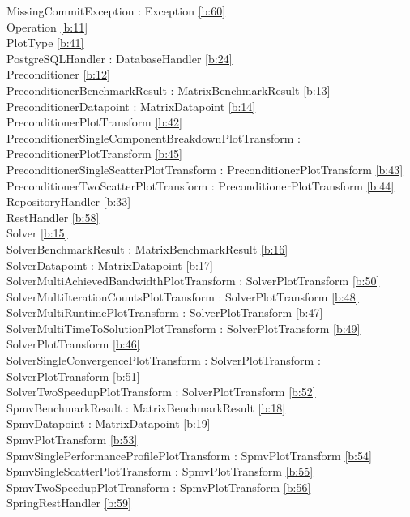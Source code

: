 MissingCommitException : Exception  \ref{b:60}\\
Operation  \ref{b:11}\\
PlotType  \ref{b:41}\\
PostgreSQLHandler : DatabaseHandler  \ref{b:24}\\
Preconditioner  \ref{b:12}\\
PreconditionerBenchmarkResult : MatrixBenchmarkResult  \ref{b:13}\\
PreconditionerDatapoint : MatrixDatapoint  \ref{b:14}\\
PreconditionerPlotTransform  \ref{b:42}\\
PreconditionerSingleComponentBreakdownPlotTransform : PreconditionerPlotTransform  \ref{b:45}\\
PreconditionerSingleScatterPlotTransform : PreconditionerPlotTransform  \ref{b:43}\\
PreconditionerTwoScatterPlotTransform : PreconditionerPlotTransform  \ref{b:44}\\
RepositoryHandler  \ref{b:33}\\
RestHandler  \ref{b:58}\\
Solver  \ref{b:15}\\
SolverBenchmarkResult : MatrixBenchmarkResult  \ref{b:16}\\
SolverDatapoint : MatrixDatapoint  \ref{b:17}\\
SolverMultiAchievedBandwidthPlotTransform : SolverPlotTransform  \ref{b:50}\\
SolverMultiIterationCountsPlotTransform : SolverPlotTransform  \ref{b:48}\\
SolverMultiRuntimePlotTransform : SolverPlotTransform  \ref{b:47}\\
SolverMultiTimeToSolutionPlotTransform : SolverPlotTransform  \ref{b:49}\\
SolverPlotTransform  \ref{b:46}\\
SolverSingleConvergencePlotTransform : SolverPlotTransform : SolverPlotTransform  \ref{b:51}\\
SolverTwoSpeedupPlotTransform : SolverPlotTransform  \ref{b:52}\\
SpmvBenchmarkResult : MatrixBenchmarkResult  \ref{b:18}\\
SpmvDatapoint : MatrixDatapoint  \ref{b:19}\\
SpmvPlotTransform  \ref{b:53}\\
SpmvSinglePerformanceProfilePlotTransform : SpmvPlotTransform  \ref{b:54}\\
SpmvSingleScatterPlotTransform : SpmvPlotTransform  \ref{b:55}\\
SpmvTwoSpeedupPlotTransform : SpmvPlotTransform  \ref{b:56}\\
SpringRestHandler \ref{b:59}\\

